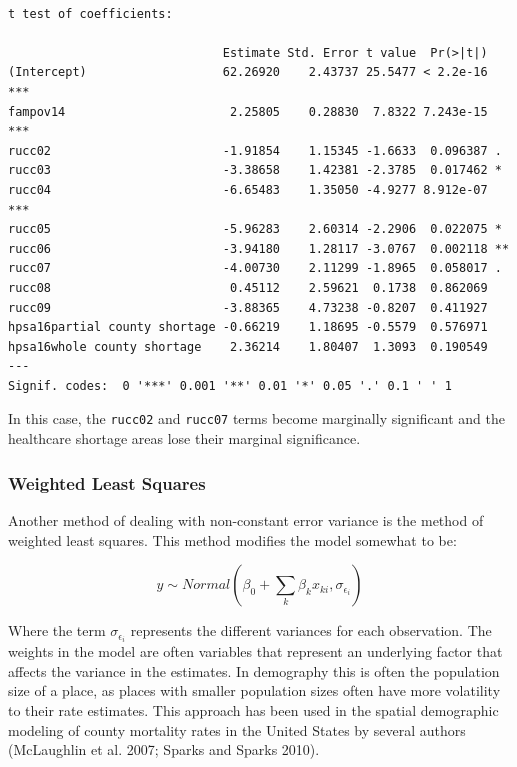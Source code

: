 \documentclass[
  letterpaper,
  DIV=11,
  numbers=noendperiod]{scrreprt}
\newenvironment{Shaded}{\begin{snugshade}}{\end{snugshade}}
\newcommand{\AttributeTok}[1]{\textcolor[rgb]{0.40,0.45,0.13}{#1}}
\newcommand{\FunctionTok}[1]{\textcolor[rgb]{0.28,0.35,0.67}{#1}}
\newcommand{\NormalTok}[1]{\textcolor[rgb]{0.00,0.23,0.31}{#1}}
\newcommand{\SpecialCharTok}[1]{\textcolor[rgb]{0.37,0.37,0.37}{#1}}
\begin{document}
\begin{Shaded}
\end{Shaded}

\begin{verbatim}

t test of coefficients:

                              Estimate Std. Error t value  Pr(>|t|)    
(Intercept)                   62.26920    2.43737 25.5477 < 2.2e-16 ***
fampov14                       2.25805    0.28830  7.8322 7.243e-15 ***
rucc02                        -1.91854    1.15345 -1.6633  0.096387 .  
rucc03                        -3.38658    1.42381 -2.3785  0.017462 *  
rucc04                        -6.65483    1.35050 -4.9277 8.912e-07 ***
rucc05                        -5.96283    2.60314 -2.2906  0.022075 *  
rucc06                        -3.94180    1.28117 -3.0767  0.002118 ** 
rucc07                        -4.00730    2.11299 -1.8965  0.058017 .  
rucc08                         0.45112    2.59621  0.1738  0.862069    
rucc09                        -3.88365    4.73238 -0.8207  0.411927    
hpsa16partial county shortage -0.66219    1.18695 -0.5579  0.576971    
hpsa16whole county shortage    2.36214    1.80407  1.3093  0.190549    
---
Signif. codes:  0 '***' 0.001 '**' 0.01 '*' 0.05 '.' 0.1 ' ' 1
\end{verbatim}

In this case, the \texttt{rucc02} and \texttt{rucc07} terms become
marginally significant and the healthcare shortage areas lose their
marginal significance.

\hypertarget{weighted-least-squares}{%
\subsubsection{Weighted Least Squares}\label{weighted-least-squares}}

Another method of dealing with non-constant error variance is the method
of weighted least squares. This method modifies the model somewhat to
be:

\[y \sim Normal(\beta_0 +\sum_k \beta_k x_{ki}, \sigma_{\epsilon_i} )\]

Where the term \(\sigma_{\epsilon_i}\) represents the different
variances for each observation. The weights in the model are often
variables that represent an underlying factor that affects the variance
in the estimates. In demography this is often the population size of a
place, as places with smaller population sizes often have more
volatility to their rate estimates. This approach has been used in the
spatial demographic modeling of county mortality rates in the United
States by several authors (McLaughlin et al. 2007; Sparks and Sparks
2010).
\end{document}
